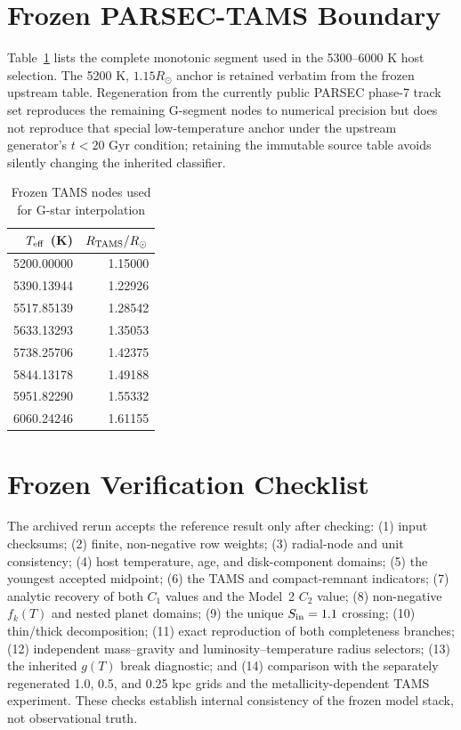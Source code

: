 \section{Frozen PARSEC-TAMS Boundary}\label{app:tams}

Table~\ref{tab:tams_nodes} lists the complete monotonic segment used in the 5300--6000 K host selection. The 5200 K, $1.15R_\odot$ anchor is retained verbatim from the frozen upstream table. Regeneration from the currently public PARSEC phase-7 track set reproduces the remaining G-segment nodes to numerical precision but does not reproduce that special low-temperature anchor under the upstream generator's $t<20$ Gyr condition; retaining the immutable source table avoids silently changing the inherited classifier.

\begin{table}[h]
\caption{Frozen TAMS nodes used for G-star interpolation}
\label{tab:tams_nodes}
\centering
\begin{tabular}{rr}
\toprule
$T_{\rm eff}$ (K) & $R_{\rm TAMS}/R_\odot$\\
\midrule
5200.00000 & 1.15000\\
5390.13944 & 1.22926\\
5517.85139 & 1.28542\\
5633.13293 & 1.35053\\
5738.25706 & 1.42375\\
5844.13178 & 1.49188\\
5951.82290 & 1.55332\\
6060.24246 & 1.61155\\
\bottomrule
\end{tabular}
\end{table}

\section{Frozen Verification Checklist}\label{app:checks}

The archived rerun accepts the reference result only after checking: (1) input checksums; (2) finite, non-negative row weights; (3) radial-node and unit consistency; (4) host temperature, age, and disk-component domains; (5) the youngest accepted midpoint; (6) the TAMS and compact-remnant indicators; (7) analytic recovery of both $C_1$ values and the Model~2 $C_2$ value; (8) non-negative $f_k(T)$ and nested planet domains; (9) the unique $S_{\rm in}=1.1$ crossing; (10) thin/thick decomposition; (11) exact reproduction of both completeness branches; (12) independent mass--gravity and luminosity--temperature radius selectors; (13) the inherited $g(T)$ break diagnostic; and (14) comparison with the separately regenerated 1.0, 0.5, and 0.25 kpc grids and the metallicity-dependent TAMS experiment. These checks establish internal consistency of the frozen model stack, not observational truth.



